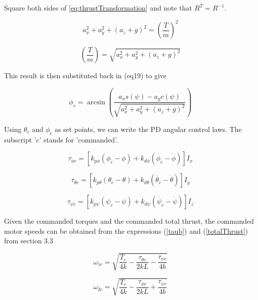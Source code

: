 Square both sides of \eqref{eq:thrustTransformation} and note that $ R^T = R^{-1}$.

\begin{equation}
a_x^2 + a_y^2 + (a_z + g)^2 = (\frac{T}{m})^2 
\end{equation}

\begin{equation}
(\frac{T}{m}) = \sqrt{a_x^2 + a_y^2 + (a_z + g)^2}
\end{equation}


This result is then substituted back in (eq19) to give

\begin{equation}
    \label{eq:phic}
    \phi_c = \arcsin( \frac{a_x s(\psi) - a_y c(\psi)}{\sqrt{a_x^2 + a_y^2 + (a_z + g)^2}} )
\end{equation}


Using $\theta_c$ and $\phi_c$ as set points, we can write the PD angular control laws. The subscript 'c' stands for 'commanded'.

\begin{equation}
    \tau_{\phi c} = [ k_{p\phi} (\phi_c - \phi) + k_{d\phi} (\dot{\phi_c} - \dot{\phi}) ] I_x
\end{equation}

\begin{equation}
    \tau_{\theta c} = [ k_{p\theta} (\theta_c - \theta) + k_{d\theta} (\dot{\theta_c} - \dot{\theta}) ] I_y
\end{equation}

\begin{equation}
    \tau_{\psi c} = [ k_{p\psi} (\psi_c - \psi) + k_{d\psi} (\dot{\psi_c} - \dot{\psi}) ] I_z 
\end{equation}

Given the commanded torques and the commanded total thrust, the commanded motor speeds can be obtained from the expressions (\ref{taub}) and (\ref{totalThrust}) from section 3.3





\begin{equation}
    \omega_{1c} = \sqrt{ \frac{T_c}{4 k} - \frac{ \tau_{\theta c}}{2 k L} - \frac{ \tau_{\psi c} }{4 b } } 
\end{equation}

\begin{equation}
    \omega_{2c} = \sqrt{ \frac{T_c}{4 k} - \frac{ \tau_{\phi c}}{2 k L}   + \frac{ \tau_{\psi c} }{4 b } }
\end{equation}


